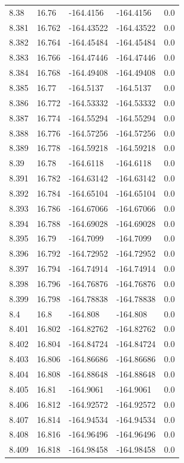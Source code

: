 \begin{tabular}{lllll}
8.38 & 16.76 & -164.4156 & -164.4156 & 0.0 \\
8.381 & 16.762 & -164.43522 & -164.43522 & 0.0 \\
8.382 & 16.764 & -164.45484 & -164.45484 & 0.0 \\
8.383 & 16.766 & -164.47446 & -164.47446 & 0.0 \\
8.384 & 16.768 & -164.49408 & -164.49408 & 0.0 \\
8.385 & 16.77 & -164.5137 & -164.5137 & 0.0 \\
8.386 & 16.772 & -164.53332 & -164.53332 & 0.0 \\
8.387 & 16.774 & -164.55294 & -164.55294 & 0.0 \\
8.388 & 16.776 & -164.57256 & -164.57256 & 0.0 \\
8.389 & 16.778 & -164.59218 & -164.59218 & 0.0 \\
8.39 & 16.78 & -164.6118 & -164.6118 & 0.0 \\
8.391 & 16.782 & -164.63142 & -164.63142 & 0.0 \\
8.392 & 16.784 & -164.65104 & -164.65104 & 0.0 \\
8.393 & 16.786 & -164.67066 & -164.67066 & 0.0 \\
8.394 & 16.788 & -164.69028 & -164.69028 & 0.0 \\
8.395 & 16.79 & -164.7099 & -164.7099 & 0.0 \\
8.396 & 16.792 & -164.72952 & -164.72952 & 0.0 \\
8.397 & 16.794 & -164.74914 & -164.74914 & 0.0 \\
8.398 & 16.796 & -164.76876 & -164.76876 & 0.0 \\
8.399 & 16.798 & -164.78838 & -164.78838 & 0.0 \\
8.4 & 16.8 & -164.808 & -164.808 & 0.0 \\
8.401 & 16.802 & -164.82762 & -164.82762 & 0.0 \\
8.402 & 16.804 & -164.84724 & -164.84724 & 0.0 \\
8.403 & 16.806 & -164.86686 & -164.86686 & 0.0 \\
8.404 & 16.808 & -164.88648 & -164.88648 & 0.0 \\
8.405 & 16.81 & -164.9061 & -164.9061 & 0.0 \\
8.406 & 16.812 & -164.92572 & -164.92572 & 0.0 \\
8.407 & 16.814 & -164.94534 & -164.94534 & 0.0 \\
8.408 & 16.816 & -164.96496 & -164.96496 & 0.0 \\
8.409 & 16.818 & -164.98458 & -164.98458 & 0.0 \\

\end{tabular}
